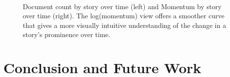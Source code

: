 \documentclass[10pt]{article}
\begin{document}
\begin{figure}
\centering
\mbox{
}
\caption{Document count by story over time (left) and Momentum by story over time (right).  The log(momentum) view offers a smoother curve that gives a more visually intuitive understanding of the change in a story's prominence over time. }
\end{figure}

\section {Conclusion and Future Work}
\end{document}
